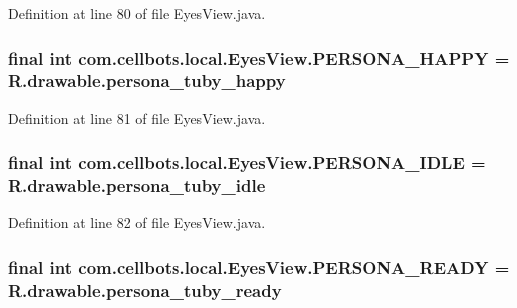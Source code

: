 Definition at line 80 of file Eyes\-View.\-java.

\hypertarget{classcom_1_1cellbots_1_1local_1_1_eyes_view_aa4dd55d01c9282aacc8bc67ad4c16d02}{
\subsubsection[{P\-E\-R\-S\-O\-N\-A\-\_\-\-H\-A\-P\-P\-Y}]{\setlength{\rightskip}{0pt plus 5cm}final int {\bf com.\-cellbots.\-local.\-Eyes\-View.\-P\-E\-R\-S\-O\-N\-A\-\_\-\-H\-A\-P\-P\-Y} = R.\-drawable.\-persona\-\_\-tuby\-\_\-happy}}\label{classcom_1_1cellbots_1_1local_1_1_eyes_view_aa4dd55d01c9282aacc8bc67ad4c16d02}


Definition at line 81 of file Eyes\-View.\-java.

\hypertarget{classcom_1_1cellbots_1_1local_1_1_eyes_view_a6eca5310e08a5f2a88d26fda0aeae437}{
\subsubsection[{P\-E\-R\-S\-O\-N\-A\-\_\-\-I\-D\-L\-E}]{\setlength{\rightskip}{0pt plus 5cm}final int {\bf com.\-cellbots.\-local.\-Eyes\-View.\-P\-E\-R\-S\-O\-N\-A\-\_\-\-I\-D\-L\-E} = R.\-drawable.\-persona\-\_\-tuby\-\_\-idle}}\label{classcom_1_1cellbots_1_1local_1_1_eyes_view_a6eca5310e08a5f2a88d26fda0aeae437}


Definition at line 82 of file Eyes\-View.\-java.

\hypertarget{classcom_1_1cellbots_1_1local_1_1_eyes_view_a649ceb68bda92b7ee23ae078cf369aa2}{
\subsubsection[{P\-E\-R\-S\-O\-N\-A\-\_\-\-R\-E\-A\-D\-Y}]{\setlength{\rightskip}{0pt plus 5cm}final int {\bf com.\-cellbots.\-local.\-Eyes\-View.\-P\-E\-R\-S\-O\-N\-A\-\_\-\-R\-E\-A\-D\-Y} = R.\-drawable.\-persona\-\_\-tuby\-\_\-ready}}\label{classcom_1_1cellbots_1_1local_1_1_eyes_view_a649ceb68bda92b7ee23ae078cf369aa2}


